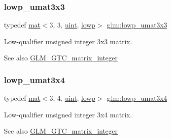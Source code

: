 \subsubsection{\texorpdfstring{lowp\+\_\+umat3x3}{lowp\_umat3x3}}
{\footnotesize\ttfamily typedef \mbox{\hyperlink{structglm_1_1mat}{mat}}$<$3, 3, \mbox{\hyperlink{group__core__precision_ga4fd29415871152bfb5abd588334147c8}{uint}}, \mbox{\hyperlink{namespaceglm_a36ed105b07c7746804d7fdc7cc90ff25ae161af3fc695e696ce3bf69f7332bc2d}{lowp}}$>$ \mbox{\hyperlink{group__gtc__matrix__integer_ga267cf15202746fe0bd9b493ce2e98652}{glm\+::lowp\+\_\+umat3x3}}}

Low-\/qualifier unsigned integer 3x3 matrix. \begin{DoxySeeAlso}{See also}
\mbox{\hyperlink{group__gtc__matrix__integer}{G\+L\+M\+\_\+\+G\+T\+C\+\_\+matrix\+\_\+integer}} 
\end{DoxySeeAlso}
\mbox{\label{group__gtc__matrix__integer_ga5a2dd2a09a6102f298973c41d4597c63}} 
\subsubsection{\texorpdfstring{lowp\+\_\+umat3x4}{lowp\_umat3x4}}
{\footnotesize\ttfamily typedef \mbox{\hyperlink{structglm_1_1mat}{mat}}$<$3, 4, \mbox{\hyperlink{group__core__precision_ga4fd29415871152bfb5abd588334147c8}{uint}}, \mbox{\hyperlink{namespaceglm_a36ed105b07c7746804d7fdc7cc90ff25ae161af3fc695e696ce3bf69f7332bc2d}{lowp}}$>$ \mbox{\hyperlink{group__gtc__matrix__integer_ga5a2dd2a09a6102f298973c41d4597c63}{glm\+::lowp\+\_\+umat3x4}}}

Low-\/qualifier unsigned integer 3x4 matrix. \begin{DoxySeeAlso}{See also}
\mbox{\hyperlink{group__gtc__matrix__integer}{G\+L\+M\+\_\+\+G\+T\+C\+\_\+matrix\+\_\+integer}} 
\end{DoxySeeAlso}
\mbox{\label{group__gtc__matrix__integer_ga41cc5d910308e4b471aa6543ce22dd20}} 
